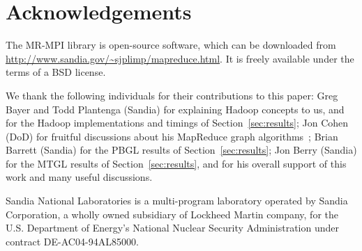 \section{Acknowledgements}
\label{sec:thanks}

The MR-MPI library is open-source software, which can be downloaded
from \url{http://www.sandia.gov/~sjplimp/mapreduce.html}.  It is
freely available under the terms of a BSD license.

We thank the following individuals for their contributions to this
paper: Greg Bayer and Todd Plantenga (Sandia) for explaining Hadoop
concepts to us, and for the Hadoop implementations and timings of
Section~\ref{sec:results}; Jon Cohen (DoD) for fruitful discussions
about his MapReduce graph algorithms~\cite{Cohen09}; Brian Barrett
(Sandia) for the PBGL results of Section~\ref{sec:results}; Jon Berry
(Sandia) for the MTGL results of Section~\ref{sec:results}, and for
his overall support of this work and many useful discussions.

Sandia National Laboratories is a multi-program laboratory operated by
Sandia Corporation, a wholly owned subsidiary of Lockheed Martin
company, for the U.S. Department of Energy's National Nuclear Security
Administration under contract DE-AC04-94AL85000.
